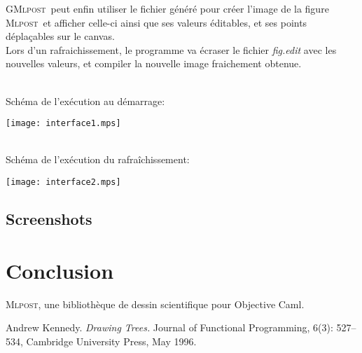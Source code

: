 \documentclass[a4paper,12pt]{article}
\newcommand{\mlpost}{\textsc{Mlpost}}
\newcommand{\gmlpost}{\textsc{GMlpost}}
\begin{document}
\gmlpost\ peut enfin utiliser le fichier généré pour créer l'image de la figure \mlpost\ et afficher celle-ci ainsi que ses valeurs éditables, et ses points déplaçables sur le canvas.
~\\

Lors d'un rafraichissement, le programme va écraser le fichier \textit{fig.edit} avec les nouvelles valeurs, et compiler la nouvelle image fraichement obtenue.

~\\

Schéma de l'exécution au démarrage:
\begin{center}
\texttt{[image: interface1.mps]}
\end{center}

~\\

Schéma de l'exécution du rafraîchissement:
\begin{center}
\texttt{[image: interface2.mps]}
\end{center}

\subsection{Screenshots}
\section{Conclusion}

\begin{thebibliography}{99}
 \mlpost, une bibliothèque de dessin 
 scientifique pour Objective Caml.

Andrew Kennedy. 
\emph{Drawing Trees.}
Journal of Functional Programming, 
6(3): 527--534, Cambridge University Press, May 1996.
\end{thebibliography}
\end{document}
